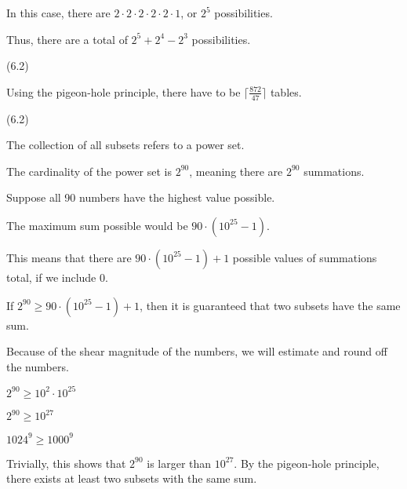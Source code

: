 \documentclass{exam}
\begin{document}
\begin{questions}
\begin{center}
In this case, there are \(2 \cdot 2 \cdot 2 \cdot 2 \cdot 2 \cdot 1\), or \(2^5\) possibilities.

\vspace{5px}

Thus, there are a total of \(2^5 + 2^4 - 2^3\) possibilities.

\end{center}

 (6.2)

\begin{center}

Using the pigeon-hole principle, there have to be \(\lceil \frac{872}{47} \rceil \) tables.

\end{center}

 (6.2)

\begin{center}

The collection of all subsets refers to a power set.

The cardinality of the power set is \(2^{90}\), meaning there are \(2^{90}\) summations.

Suppose all 90 numbers have the highest value possible.

The maximum sum possible would be \(90 \cdot (10^{25}-1)\).

This means that there are \(90 \cdot (10^{25} - 1) +1\) possible values of summations total, if we include 0.

If \(2^{90} \geq 90 \cdot (10^{25} - 1) + 1\), then it is guaranteed that two subsets have the same sum.

Because of the shear magnitude of the numbers, we will estimate and round off the numbers.

\(2^{90} \geq 10^2 \cdot 10^{25}\)

\(2^{90} \geq 10^{27}\)

\(1024^{9} \geq 1000^{9}\)

Trivially, this shows that \(2^{90}\) is larger than \(10^{27}\). By the pigeon-hole principle, there exists at least two subsets with the same sum.


\end{center}
\end{questions}
\end{document}
